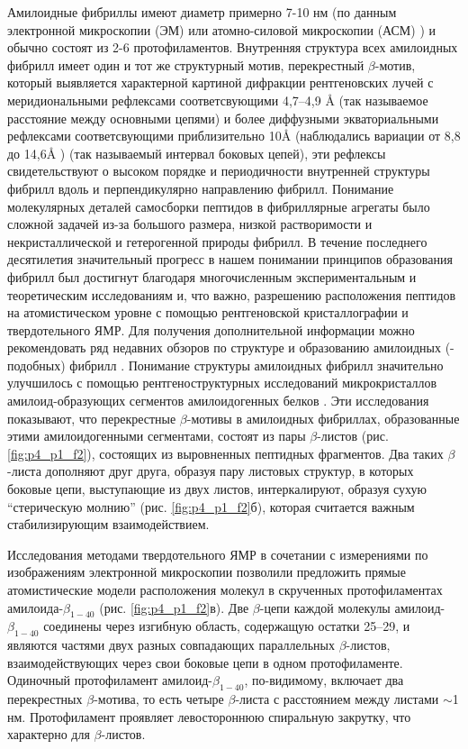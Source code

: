     Амилоидные фибриллы имеют диаметр примерно 7-10 нм (по данным электронной микроскопии (ЭМ) или атомно-силовой микроскопии (АСМ) \cite{chiti_protein_2006,makin_structures_2005,rochet_amyloid_2000}) и обычно состоят из 2-6 протофиламентов. Внутренняя структура всех амилоидных фибрилл имеет один и тот же структурный мотив, перекрестный $\beta$-мотив, который выявляется характерной картиной дифракции рентгеновских лучей \cite{sunde_common_1997} с меридиональными рефлексами соответсвующими 4,7–4,9 \AA{} (так называемое расстояние между основными цепями) и более диффузными экваториальными рефлексами соответсвующими приблизительно 10\AA{} (наблюдались вариации от 8,8 до 14,6\AA{} \cite{fandrich_behaviour_2002}) (так называемый интервал боковых цепей), эти рефлексы свидетельствуют о высоком порядке и периодичности внутренней структуры фибрилл вдоль и перпендикулярно направлению фибрилл. Понимание молекулярных деталей самосборки пептидов в фибриллярные агрегаты было сложной задачей из-за большого размера, низкой растворимости и некристаллической и гетерогенной природы фибрилл. В течение последнего десятилетия значительный прогресс в нашем понимании принципов образования фибрилл был достигнут благодаря многочисленным экспериментальным и теоретическим исследованиям и, что важно, разрешению расположения пептидов на атомистическом уровне с помощью рентгеновской кристаллографии и твердотельного ЯМР. Для получения дополнительной информации можно рекомендовать ряд недавних обзоров по структуре и образованию амилоидных (-подобных) фибрилл \cite{kumar_mechanisms_2010,rambaran_amyloid_2008,fandrich_structural_2009}. Понимание структуры амилоидных фибрилл значительно улучшилось с помощью рентгеноструктурных исследований микрокристаллов амилоид-образующих сегментов амилоидогенных белков \cite{nelson_structure_2005,sawaya_atomic_2007}. Эти исследования показывают, что перекрестные $\beta$-мотивы в амилоидных фибриллах, образованные этими амилоидогенными сегментами, состоят из пары $\beta$-листов (рис. \ref{fig:p4_p1_f2}), состоящих из выровненных пептидных фрагментов. Два таких $\beta$-листа дополняют друг друга, образуя пару листовых структур, в которых боковые цепи, выступающие из двух листов, интеркалируют, образуя сухую ``стерическую молнию'' (рис. \ref{fig:p4_p1_f2}б), которая считается важным стабилизирующим взаимодействием.
  
    Исследования методами твердотельного ЯМР в сочетании с измерениями по изображениям электронной микроскопии позволили предложить прямые атомистические модели расположения молекул в скрученных протофиламентах амилоида-$\beta_{1-40}$ \cite{petkova_experimental_2006,tycko_molecular_2006} (рис. \ref{fig:p4_p1_f2}в). Две $\beta$-цепи каждой молекулы амилоид-$\beta_{1-40}$ соединены через изгибную область, содержащую остатки 25–29, и являются частями двух разных совпадающих параллельных $\beta$-листов, взаимодействующих через свои боковые цепи в одном протофиламенте. Одиночный протофиламент амилоид-$\beta_{1-40}$, по-видимому, включает два перекрестных $\beta$-мотива, то есть четыре $\beta$-листа с расстоянием между листами $\sim$1 нм. Протофиламент проявляет левостороннюю спиральную закрутку, что характерно для $\beta$-листов.

